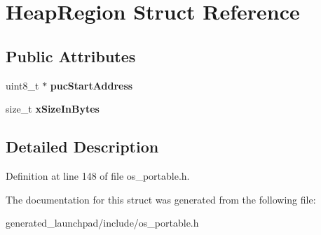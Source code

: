 \hypertarget{structHeapRegion}{}\section{Heap\+Region Struct Reference}
\label{structHeapRegion}
\subsection*{Public Attributes}
\begin{DoxyCompactItemize}
\item 
\mbox{\label{structHeapRegion_aab323508c34642ebfb884a68441d97fc}} 
uint8\+\_\+t $\ast$ {\bfseries puc\+Start\+Address}
\item 
\mbox{\label{structHeapRegion_a5933b0fd422e70a92ceef839b89a757f}} 
size\+\_\+t {\bfseries x\+Size\+In\+Bytes}
\end{DoxyCompactItemize}


\subsection{Detailed Description}


Definition at line 148 of file os\+\_\+portable.\+h.



The documentation for this struct was generated from the following file\+:\begin{DoxyCompactItemize}
\item 
generated\+\_\+launchpad/include/os\+\_\+portable.\+h\end{DoxyCompactItemize}
